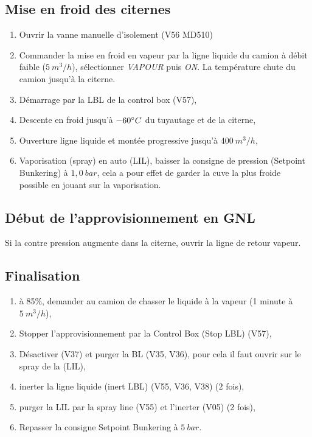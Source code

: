 \documentclass[12pt,a4paper]{article}
\begin{document}
\subsection*{Mise en froid des citernes}

\begin{enumerate}[resume]
 \item Ouvrir la vanne manuelle d'isolement (V56 MD510)
 \item Commander la mise en froid en vapeur par la ligne liquide du camion à 
débit faible ($5~m^3/h $), sélectionner \emph{VAPOUR} puis \emph{ON}. La 
température chute du camion jusqu'à la citerne.
 \item Démarrage par la LBL de la control box (V57),
 \item Descente en froid jusqu'à $-60 \degree C$ du tuyautage et de la citerne,
 \item Ouverture ligne liquide et montée progressive jusqu'à $400~m^3/h$,
 \item Vaporisation (spray) en auto (LIL), baisser la consigne de pression (Setpoint Bunkering) à $1,0~bar$, cela a pour effet de garder la cuve la plus froide possible en jouant sur la vaporisation. 
\end{enumerate}
\subsection*{Début de l'approvisionnement en GNL}
Si la contre pression augmente dans la citerne, ouvrir la ligne de retour vapeur. 

\subsection*{Finalisation}
\begin{enumerate}
 \item à 85\%, demander au camion de chasser le liquide à la vapeur (1 minute à $5~m^3/h$),
 \item Stopper l'approvisionnement par la Control Box (Stop LBL) (V57),
 \item Désactiver (V37) et purger la BL (V35, V36), pour cela il faut ouvrir sur le spray de la (LIL),
 \item inerter la ligne liquide (inert LBL) (V55, V36, V38) (2 fois),
 \item purger la LIL par la spray line (V55) et l'inerter (V05) (2 fois),
 \item Repasser la consigne Setpoint Bunkering à $5~bar$.
\end{enumerate}
\end{document}
